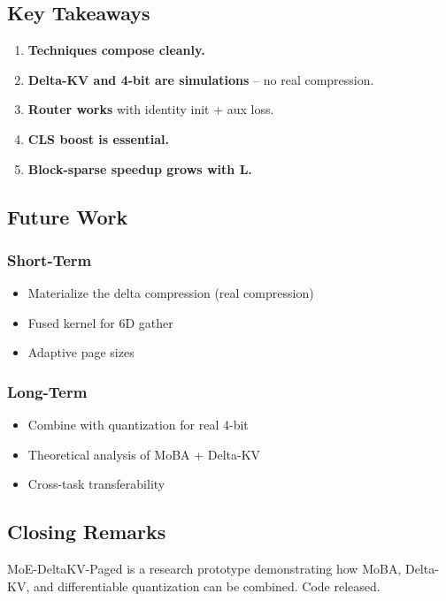 \subsection{Key Takeaways}

\begin{enumerate}
\item \textbf{Techniques compose cleanly.}
\item \textbf{Delta-KV and 4-bit are simulations} -- no real compression.
\item \textbf{Router works} with identity init + aux loss.
\item \textbf{CLS boost is essential.}
\item \textbf{Block-sparse speedup grows with L.}

\end{enumerate}
\subsection{Future Work}

\subsubsection{Short-Term}
\begin{itemize}
\item Materialize the delta compression (real compression)
\item Fused kernel for 6D gather
\item Adaptive page sizes

\end{itemize}
\subsubsection{Long-Term}
\begin{itemize}
\item Combine with quantization for real 4-bit
\item Theoretical analysis of MoBA + Delta-KV
\item Cross-task transferability

\end{itemize}
\subsection{Closing Remarks}

MoE-DeltaKV-Paged is a research prototype demonstrating how MoBA, Delta-KV, 
and differentiable quantization can be combined. Code released.

